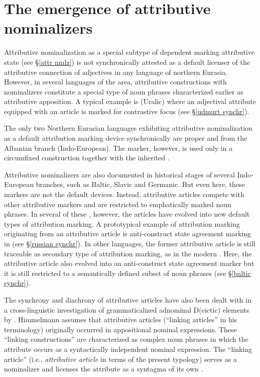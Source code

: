 \section[Attributive nominalizers]{The emergence of attributive nominalizers}
Attributive nominalization as a special subtype of dependent marking attributive state (see \S\ref{attr nmlz}) is not synchronically attested as a default licenser of the attributive connection of adjectives in any language of northern Eurasia. However, in several languages of the area, attributive constructions with nominalizers constitute a special type of noun phrases characterized earlier as attributive apposition. A typical example is  (Uralic) where an adjectival attribute equipped with an article is marked for contrastive focus (see \S\ref{udmurt synchr}).

The only two Northern Eurasian languages exhibiting attributive nominalization as a default attribution marking device synchronically are  proper and  from the Albanian branch (Indo-European). The marker, however, is used only in a circumfixed construction together with the inherited .

Attributive nominalizers are also documented in historical stages of several Indo-European branches, such as Baltic, Slavic and Germanic. But even here, these markers are not the default devices. Instead, attributive articles compete with other attributive markers and are restricted to emphatically marked noun phrases. In several of these , however, the articles have evolved into new default types of attribution marking. A prototypical example of attribution marking originating from an attributive article is anti\hyp{}construct state agreement marking in  (see \S\ref{russian synchr}). In other languages, the former attributive article is still traceable as secondary type of attribution marking, as in the modern . Here, the attributive article also evolved into an anti\hyp{}construct state agreement marker but it is still restricted to a semantically defined subset of noun phrases (see \S\ref{baltic synchr}). 

The synchrony and diachrony of attributive articles have also been dealt with in a cross-linguistic investigation of grammaticalized adnominal D(eictic) elements by \cite{himmelmann1997}. Himmelmann assumes that attributive articles (“linking articles” in his terminology) originally occurred in appositional nominal expressions. These “linking constructions” are characterized as complex noun phrases in which the attribute occurs as a syntactically independent nominal expression. The “linking article” (i.e., \textit{attributive article} in terms of the present typology) serves as a nominalizer and licenses the attribute as a syntagma of its own \cite[188]{himmelmann1997}.

